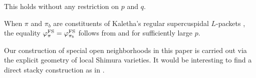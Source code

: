 \documentclass[12pt,reqno]{amsart}
\begin{document}
This holds without any restriction on $p$ and $q$. %

\begin{rmk}
    When $\pi$ and $\pi_b$ are constituents of Kaletha's regular supercuspidal $L$-packets \cite{Kal19}, the equality $\varphi^{\operatorname{FS}}_\pi = \varphi^{\operatorname{FS}}_{\pi_b}$ follows from \cite[Corollary 3.4.12]{Var24} and \cite[Corollary 1.3]{Han26} for sufficiently large $p$. 
\end{rmk}


Our construction of special open neighborhoods in this paper is carried out via the explicit geometry of local Shimura varieties. It would be interesting to find a direct stacky construction as in . %

%
%

\renewcommand\bibfont{\footnotesize}
\printbibliography
\end{document}
